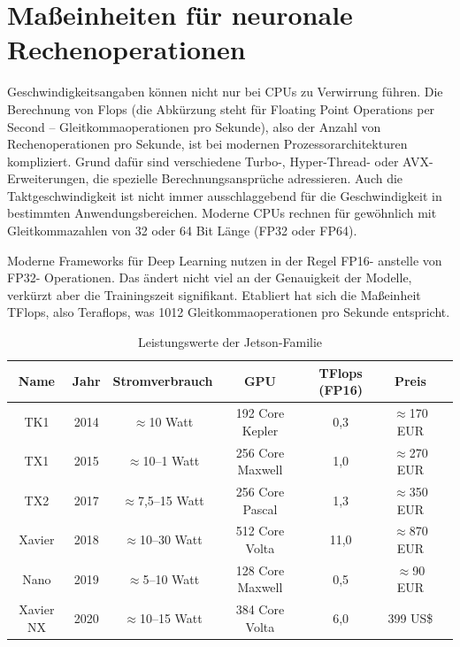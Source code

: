 \section{Maßeinheiten für neuronale Rechenoperationen}

Geschwindigkeitsangaben können nicht nur bei CPUs zu Verwirrung führen. Die Berechnung von Flops (die Abkürzung steht für Floating Point Operations per Second – Gleitkomma­operationen pro Sekunde), also der Anzahl von Rechenoperationen pro Sekunde, ist bei modernen Prozessorarchitekturen kompliziert. Grund dafür sind verschiedene Turbo-, Hyper-­Thread- oder AVX-Erweiterungen, die spezielle Berechnungsansprüche adressieren. Auch die Taktgeschwindigkeit ist nicht immer ausschlaggebend für die Geschwindigkeit in bestimmten Anwendungsbereichen. Moderne CPUs rechnen für gewöhnlich mit Gleitkommazahlen von 32 oder 64 Bit Länge (FP32 oder FP64). 

Moderne Frameworks für Deep Learning nutzen in der Regel FP16- anstelle von FP32- Operationen. Das ändert nicht viel an der Genauigkeit der Modelle, verkürzt aber die Trainingszeit signifikant. Etabliert hat sich die Maßeinheit TFlops, also Teraflops, was 1012 Gleitkommaoperationen pro Sekunde entspricht. 



\begin{table}
  \caption{Leistungswerte der Jetson-Familie}
  
  \begin{tabular}{ccccc cc}
   Name      & Jahr &  Stromverbrauch      & GPU              & TFlops (FP16) &  Preis           \\ \hline
   TK1       & 2014 & $\approx$10 Watt     & 192 Core Kepler  &  0,3          & $\approx$170 EUR \\  
   TX1       & 2015 & $\approx$10–1 Watt   & 256 Core Maxwell &  1,0          & $\approx$270 EUR \\  
   TX2       & 2017 & $\approx$7,5–15 Watt & 256 Core Pascal  &  1,3          & $\approx$350 EUR \\  
   Xavier    & 2018 & $\approx$10–30 Watt  & 512 Core Volta   & 11,0          & $\approx$870 EUR \\    
   Nano      & 2019 & $\approx$5–10 Watt   & 128 Core Maxwell &  0,5          & $\approx$90 EUR  \\    
   Xavier NX & 2020 & $\approx$10–15 Watt  & 384 Core Volta   &  6,0          &  399 US\$        \\  
  \end{tabular}
\end{table}


